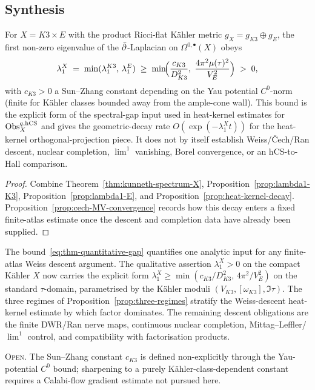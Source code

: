 \subsection{Synthesis}
\label{subsec:synthesis}

\begin{theorem}
\label{thm:quantitative-spectral-gap-weiss}
\ClaimStatusTheorem{}
For $X = K3 \times E$ with the product Ricci-flat K\"ahler metric
$g_X = g_{K3} \oplus g_E$, the first non-zero eigenvalue of the
$\bar\partial$-Laplacian on $\Omega^{0,\bullet}(X)$ obeys
\begin{equation}
\label{eq:thm-quantitative-gap}
 \lambda_1^X \;=\; \min(\lambda_1^{K3},\, \lambda_1^E)
 \;\geq\; \min\!\Bigl( \frac{c_{K3}}{D_{K3}^2},\; \frac{4\pi^2 \mu(\tau)^2}{V_E^2} \Bigr)
 \;>\; 0,
\end{equation}
with $c_{K3} > 0$ a Sun--Zhang constant depending on the Yau potential
$C^0$-norm \textup{(}finite for K\"ahler classes bounded away from the
ample-cone wall\textup{)}. This bound is the explicit form of the
spectral-gap input used in heat-kernel estimates for
$\mathrm{Obs}^{q,\mathrm{hCS}}_X$ and gives the geometric-decay rate
$O(\exp(-\lambda_1^X t))$ for the heat-kernel orthogonal-projection
piece. It does not by itself establish Weiss/\v{C}ech/Ran descent,
nuclear completion, $\lim^1$ vanishing, Borel convergence, or an
hCS-to-Hall comparison.
\end{theorem}

\begin{proof}
Combine Theorem~\ref{thm:kunneth-spectrum-X},
Proposition~\ref{prop:lambda1-K3}, Proposition~\ref{prop:lambda1-E},
and Proposition~\ref{prop:heat-kernel-decay}. Proposition~\ref{prop:cech-MV-convergence}
records how this decay enters a fixed finite-atlas estimate once the
descent and completion data have already been supplied.
\end{proof}

\begin{corollary}
\label{cor:weiss-descent-quantitative}
\ClaimStatusCorollary{}
The bound~\eqref{eq:thm-quantitative-gap} quantifies one analytic input
for any finite-atlas Weiss descent argument. The qualitative assertion
$\lambda_1^X > 0$ on the compact K\"ahler
$X$ now carries the explicit form
$\lambda_1^X \geq \min(c_{K3}/D_{K3}^2,\, 4\pi^2/V_E^2)$ on the standard
$\tau$-domain, parametrised by the K\"ahler moduli $(V_{K3}, [\omega_{K3}],
\Im\tau)$. The three regimes of
Proposition~\ref{prop:three-regimes} stratify the Weiss-descent
heat-kernel estimate by which factor dominates. The remaining descent
obligations are the finite DWR/Ran nerve maps, continuous nuclear
completion, Mittag--Leffler/$\lim^1$ control, and compatibility with
factorisation products.
\end{corollary}

\textsc{Open.} The Sun--Zhang constant $c_{K3}$ is defined
non-explicitly through the Yau-potential $C^0$ bound; sharpening to a
purely K\"ahler-class-dependent constant requires a Calabi-flow
gradient estimate not pursued here.
